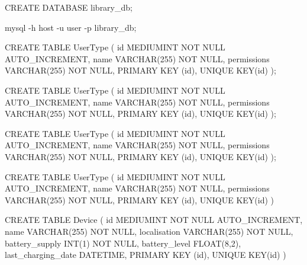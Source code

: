 CREATE DATABASE library_db;

mysql -h host -u user -p library_db;

CREATE TABLE UserType (
            id MEDIUMINT NOT NULL AUTO_INCREMENT, 
            name VARCHAR(255) NOT NULL, 
            permissions VARCHAR(255) NOT NULL, 
            PRIMARY KEY (id), 
            UNIQUE KEY(id) 
            );

CREATE TABLE UserType (
            id MEDIUMINT NOT NULL AUTO_INCREMENT, 
            name VARCHAR(255) NOT NULL, 
            permissions VARCHAR(255) NOT NULL, 
            PRIMARY KEY (id), 
            UNIQUE KEY(id) 
            );


CREATE TABLE UserType (
                id MEDIUMINT NOT NULL AUTO_INCREMENT, 
                name VARCHAR(255) NOT NULL, 
                permissions VARCHAR(255) NOT NULL, 
                PRIMARY KEY (id), 
                UNIQUE KEY(id) 
                );

CREATE TABLE UserType (
            id MEDIUMINT NOT NULL AUTO_INCREMENT, 
            name VARCHAR(255) NOT NULL, 
            permissions VARCHAR(255) NOT NULL, 
            PRIMARY KEY (id), 
            UNIQUE KEY(id) 
            )
    


CREATE TABLE Device (
            id MEDIUMINT NOT NULL AUTO_INCREMENT, 
            name VARCHAR(255) NOT NULL, 
            localisation VARCHAR(255) NOT NULL, 
            battery_supply INT(1) NOT NULL, 
            battery_level FLOAT(8,2), 
            last_charging_date DATETIME, 
            PRIMARY KEY (id), 
            UNIQUE KEY(id) 
            )